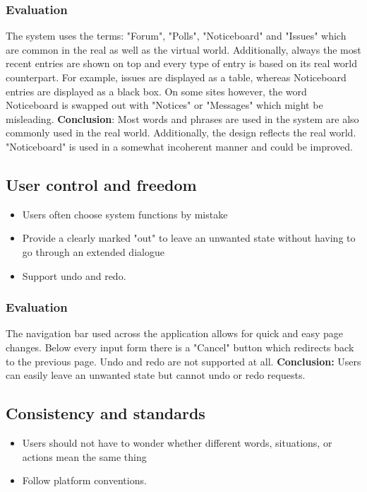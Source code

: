 \subsubsection{Evaluation}
The system uses the terms: "Forum", "Polls", "Noticeboard" and "Issues" which are common in the real as well as the virtual world. Additionally, always the most recent entries are shown on top and every type of entry is based on its real world counterpart. For example, issues are displayed as a table, whereas Noticeboard entries are displayed as a black box. On some sites however, the word Noticeboard is swapped out with "Notices" or "Messages" which might be misleading. \textbf{Conclusion}: Most words and phrases are used in the system are also commonly used in the real world. Additionally, the design reflects the real world. "Noticeboard" is used in a somewhat incoherent manner and could be improved.

\subsection{User control and freedom}

\begin{itemize}
    \item Users often choose system functions by mistake
    \item Provide a clearly marked "out" to leave an unwanted state without having to go through an extended dialogue
    \item Support undo and redo.
\end{itemize}

\subsubsection{Evaluation}
The navigation bar used across the application allows for quick and easy page changes. Below every input form there is a "Cancel" button which redirects back to the previous page. Undo and redo are not supported at all. \textbf{Conclusion:} Users can easily leave an unwanted state but cannot undo or redo requests.


\subsection{Consistency and standards}

\begin{itemize}
    \item Users should not have to wonder whether different words, situations, or actions mean the same thing
    \item Follow platform conventions.
\end{itemize}

